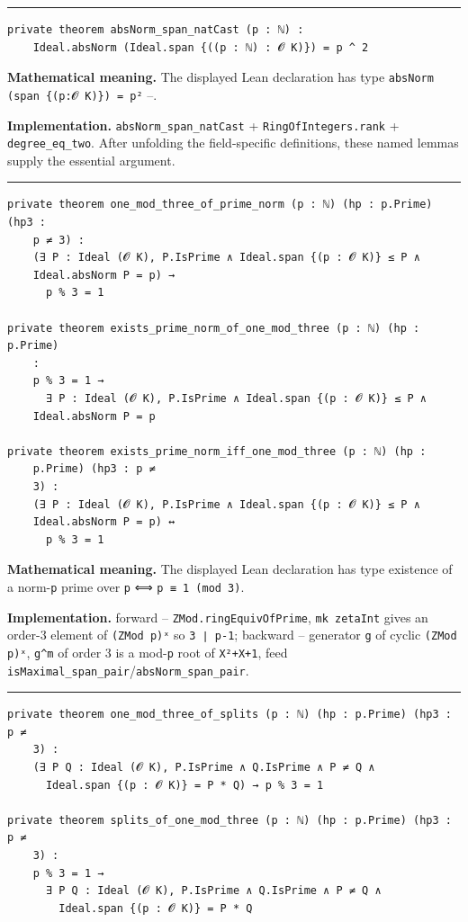 \documentclass[UTF8,a4paper,11pt,fontset=fandol]{ctexart}
\theoremstyle{definition}
\newcommand{\statementsep}{\par\medskip\hrule\medskip}
\begin{document}
\statementsep
\begin{verbatim}
private theorem absNorm_span_natCast (p : ℕ) :
    Ideal.absNorm (Ideal.span {((p : ℕ) : 𝓞 K)}) = p ^ 2
\end{verbatim}
\noindent\textbf{Mathematical meaning.} The displayed Lean declaration has type \texttt{absNorm (span \{(p:𝓞 K)\}) = p²} --.\par
\noindent\textbf{Implementation.} \texttt{absNorm\_\allowbreak{}span\_\allowbreak{}natCast} + \texttt{RingOfIntegers.\allowbreak{}rank} + \texttt{degree\_\allowbreak{}eq\_\allowbreak{}two}. After unfolding the field-specific definitions, these named lemmas supply the essential argument.\par
\statementsep
\begin{verbatim}
private theorem one_mod_three_of_prime_norm (p : ℕ) (hp : p.Prime) (hp3 :
    p ≠ 3) :
    (∃ P : Ideal (𝓞 K), P.IsPrime ∧ Ideal.span {(p : 𝓞 K)} ≤ P ∧
    Ideal.absNorm P = p) →
      p % 3 = 1

private theorem exists_prime_norm_of_one_mod_three (p : ℕ) (hp : p.Prime)
    :
    p % 3 = 1 →
      ∃ P : Ideal (𝓞 K), P.IsPrime ∧ Ideal.span {(p : 𝓞 K)} ≤ P ∧
    Ideal.absNorm P = p

private theorem exists_prime_norm_iff_one_mod_three (p : ℕ) (hp :
    p.Prime) (hp3 : p ≠
    3) :
    (∃ P : Ideal (𝓞 K), P.IsPrime ∧ Ideal.span {(p : 𝓞 K)} ≤ P ∧
    Ideal.absNorm P = p) ↔
      p % 3 = 1
\end{verbatim}
\noindent\textbf{Mathematical meaning.} The displayed Lean declaration has type existence of a norm-\texttt{p} prime over \texttt{p} ⟺ \texttt{p ≡ 1 (mod 3)}.\par
\noindent\textbf{Implementation.} forward -- \texttt{ZMod.\allowbreak{}ringEquivOfPrime}, \texttt{mk zetaInt} gives an order-3 element of \texttt{(ZMod p)ˣ} so \texttt{3 ∣ p-1}; backward -- generator \texttt{g} of cyclic \texttt{(ZMod p)ˣ}, \texttt{g\textasciicircum{}m} of order 3 is a mod-\texttt{p} root of \texttt{X²+X+1}, feed \texttt{isMaximal\_\allowbreak{}span\_\allowbreak{}pair}/\texttt{absNorm\_\allowbreak{}span\_\allowbreak{}pair}.\par
\statementsep
\begin{verbatim}
private theorem one_mod_three_of_splits (p : ℕ) (hp : p.Prime) (hp3 : p ≠
    3) :
    (∃ P Q : Ideal (𝓞 K), P.IsPrime ∧ Q.IsPrime ∧ P ≠ Q ∧
      Ideal.span {(p : 𝓞 K)} = P * Q) → p % 3 = 1

private theorem splits_of_one_mod_three (p : ℕ) (hp : p.Prime) (hp3 : p ≠
    3) :
    p % 3 = 1 →
      ∃ P Q : Ideal (𝓞 K), P.IsPrime ∧ Q.IsPrime ∧ P ≠ Q ∧
        Ideal.span {(p : 𝓞 K)} = P * Q
\end{verbatim}
\end{document}
